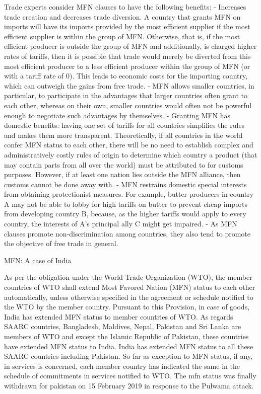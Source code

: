 \documentclass[]{book}
\begin{document}
Trade experts consider MFN clauses to have the following benefits:
- Increases trade creation and decreases trade diversion. A country that grants MFN on imports will have its imports provided by the most efficient supplier if the most efficient supplier is within the group of MFN. Otherwise, that is, if the most efficient producer is outside the group of MFN and additionally, is charged higher rates of tariffs, then it is possible that trade would merely be diverted from this most efficient producer to a less efficient producer within the group of MFN (or with a tariff rate of 0). This leads to economic costs for the importing country, which can outweigh the gains from free trade.
- MFN allows smaller countries, in particular, to participate in the advantages that larger countries often grant to each other, whereas on their own, smaller countries would often not be powerful enough to negotiate such advantages by themselves.
- Granting MFN has domestic benefits: having one set of tariffs for all countries simplifies the rules and makes them more transparent. Theoretically, if all countries in the world confer MFN status to each other, there will be no need to establish complex and administratively costly rules of origin to determine which country a product (that may contain parts from all over the world) must be attributed to for customs purposes. However, if at least one nation lies outside the MFN alliance, then customs cannot be done away with.
- MFN restrains domestic special interests from obtaining protectionist measures. For example, butter producers in country A may not be able to lobby for high tariffs on butter to prevent cheap imports from developing country B, because, as the higher tariffs would apply to every country, the interests of A's principal ally C might get impaired.
- As MFN clauses promote non-discrimination among countries, they also tend to promote the objective of free trade in general.

MFN: A case of India

As per the obligation under the World Trade Organization (WTO), the member countries of WTO shall extend Most Favored Nation (MFN) status to each other automatically, unless otherwise specified in the agreement or schedule notified to the WTO by the member country. Pursuant to this Provision, in case of goods, India has extended MFN status to member countries of WTO. As regards SAARC countries, Bangladesh, Maldives, Nepal, Pakistan and Sri Lanka are members of WTO and except the Islamic Republic of Pakistan, these countries have extended MFN status to India. India has extended MFN status to all these SAARC countries including Pakistan. So far as exception to MFN status, if any, in services is concerned, each member country has indicated the same in the schedule of commitments in services notified to WTO. The mfn status was finally withdrawn for pakistan on 15 February 2019 in response to the Pulwama attack.
\end{document}

